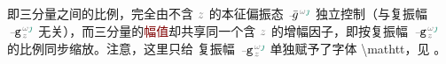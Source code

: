 即三分量之间的比例，完全由不含 $\mathcolor{gray}{z}$ 的\textcolor{PineGreen}{本征偏振态} $\Xint{{}^{}_{\mathcolor{gray}{-}}}{10}{\bar{g}}^{\;\!\mathcolor{gray}{\omega} \textcolor{PineGreen}{\jmath}}$ 独立控制（与\textcolor{PineGreen}{复振幅} $\Xint{\begin{smallmatrix} ~ \\ {}^{}_{\mathcolor{gray}{-}} \\ ~ \end{smallmatrix}}{09}{\mathtt{g}}^{\;\!\mathcolor{gray}{\omega} \textcolor{PineGreen}{\jmath}}_{\;\! \mathcolor{gray}{z}}$ 无关），而三分量的\textcolor{Maroon}{幅值}却共享同一个含 $\mathcolor{gray}{z}$ 的增幅因子，即按\textcolor{PineGreen}{复振幅} $\Xint{\begin{smallmatrix} ~ \\ {}^{}_{\mathcolor{gray}{-}} \\ ~ \end{smallmatrix}}{09}{\mathtt{g}}^{\;\!\mathcolor{gray}{\omega} \textcolor{PineGreen}{\jmath}}_{\;\! \mathcolor{gray}{z}}$ 的比例同步缩放。注意，这里只给 \textcolor{PineGreen}{复振幅} $\Xint{\begin{smallmatrix} ~ \\ {}^{}_{\mathcolor{gray}{-}} \\ ~ \end{smallmatrix}}{09}{\mathtt{g}}^{\;\!\mathcolor{gray}{\omega} \textcolor{PineGreen}{\jmath}}_{\;\! \mathcolor{gray}{z}}$ 单独赋予了字体 \textbackslash mathtt，见 。

